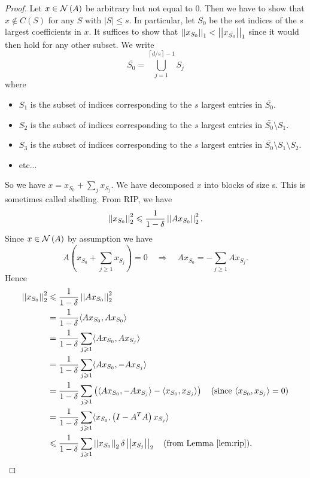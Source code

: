 \documentclass[11pt]{article}
\begin{document}
\begin{proof}
Let \(x \in \mathcal N\left(A\right)\) be arbitrary but not equal to 0. Then we have to show that \(x \notin C(S)\) for any \(S\) with \(|S| \leqslant s\). In particular, let \(S_{0}\) be the set indices of the \(s\) largest coefficients in \(x\). It suffices to show that \(\left|\left|x_{S_0}\right|\right|_1<\left|\left|x_{\bar{S_0}}\right|\right|_1\) since it would then hold for any other subset.
We write
\[\bar{S_0}=\bigcup_{j=1}^{\left\lceil d/s\right\rceil-1} S_{j}\]
where
\begin{itemize}
    \item \(S_{1}\) is the subset of indices corresponding to the \(s\) largest entries in \(\bar{S_0}\).
    \item \(S_{2}\) is the subset of indices corresponding to the \(s\) largest entries in \(\bar{S_0} \setminus S_{1}\).
    \item \(S_{3}\) is the subset of indices corresponding to the \(s\) largest entries in \(\bar{S_0} \setminus S_{1} \setminus S_{2}\).
    \item etc...
\end{itemize}
So we have \(x=x_{S_{0}}+\sum_{j} x_{S_{j}}\). We have decomposed \(x\) into blocks of size s. This is sometimes called shelling. From RIP, we have
\[\left|\left|x_{S_0}\right|\right|_2^2\leqslant\frac{1}{1-\delta}\left|\left|Ax_{S_0}\right|\right|_2^2.\]
Since \(x \in \mathcal N\left(A\right)\) by assumption we have
\[A\left(x_{S_{0}}+\sum_{j \geqslant 1} x_{S_{j}}\right)=0\quad\Rightarrow\quad A x_{S_{0}}=-\sum_{j \geqslant 1} A x_{S_{j}}.\]
Hence
\[\begin{aligned}
    \left|\left|x_{S_0}\right|\right|_2^2
    &\leqslant \frac{1}{1-\delta}\left|\left|Ax_{S_0}\right|\right|_2^2\\
    &= \frac{1}{1-\delta}\langle Ax_{S_0},Ax_{S_0}\rangle\\
    &= \frac{1}{1-\delta}\sum_{j\geqslant 1}\langle Ax_{S_0},Ax_{S_j}\rangle\\
    &= \frac{1}{1-\delta}\sum_{j\geqslant 1}\langle Ax_{S_0},-Ax_{S_j}\rangle\\
    &= \frac{1}{1-\delta}\sum_{j\geqslant 1}\left(\langle Ax_{S_0},-Ax_{S_j}\rangle-\langle x_{S_0},x_{S_j}\rangle\right)\quad\textnormal{(since }\langle x_{S_0},x_{S_j}\rangle=0\textnormal{)}\\
    &= \frac{1}{1-\delta}\sum_{j\geqslant 1}\langle x_{S_0},\left(I-A^TA\right)x_{S_j}\rangle\\
    &\leqslant \frac{1}{1-\delta}\sum_{j\geqslant 1}\left|\left|x_{S_0}\right|\right|_2\delta\left|\left|x_{S_j}\right|\right|_2\quad\textnormal{(from Lemma \ref{lem:rip})}.
\end{aligned}\]

\end{proof}
\end{document}
